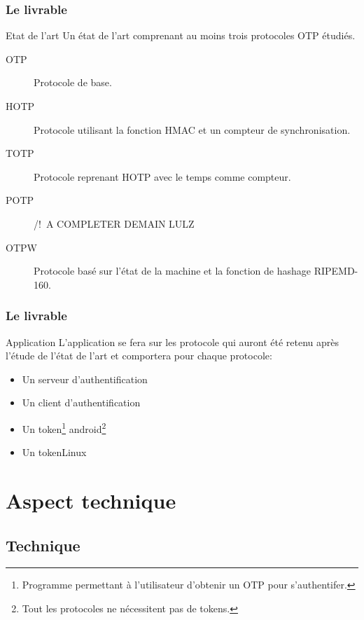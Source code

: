 \documentclass{beamer}
\begin{document}
\begin{frame}
\frametitle{Le livrable}
\begin{block}{Etat de l'art} 
Un état de l'art comprenant au moins trois protocoles OTP étudiés.
\begin{description}
 \item[OTP] Protocole de base.
 \item[HOTP] Protocole utilisant la fonction HMAC et un compteur de 
synchronisation.
 \item[TOTP] Protocole reprenant HOTP avec le temps comme compteur.
 \item[POTP] /!\ A COMPLETER DEMAIN LULZ
 \item[OTPW] Protocole basé sur l'état de la machine et la fonction de hashage RIPEMD-160.
\end{description}
\end{block}
\end{frame}

\begin{frame}
\frametitle{Le livrable}
\begin{block}{Application}
    L'application se fera sur les protocole qui auront été retenu après l'étude de 
  l'état de l'art et comportera pour chaque protocole:
  \begin{itemize}
    \item Un serveur d'authentification
    \item Un client d'authentification
    \item Un token\footnote[1]{Programme permettant à l'utilisateur d'obtenir un 
      OTP pour s'authentifer.} android\footnote[2]{Tout les protocoles ne 
      nécessitent pas de tokens.}
    \item Un token\footnotemark[1] Linux\footnotemark[2]
  \end{itemize}
\end{block}

\end{frame}


\section{Aspect technique}

\subsection{Technique}
\end{document}
